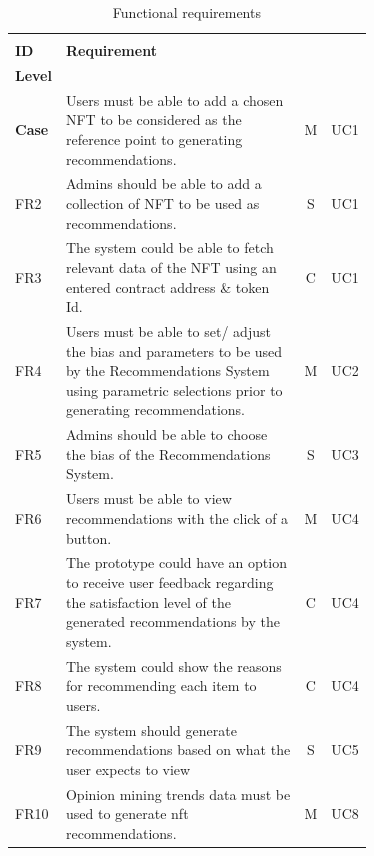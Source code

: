 \begin{longtable}{|l|p{0.71\linewidth}|c|l|}
\caption{Functional requirements}\\ 
\hline
\begin{tabular}[c]{@{}l@{}}\textbf{FR}\\\textbf{ID}\end{tabular}
& \textbf{Requirement} & \begin{tabular}[c]{@{}c@{}}\textbf{Priority}\\\textbf{Level}\end{tabular} & 
\begin{tabular}[c]{@{}c@{}}\textbf{Use}\\\textbf{Case}\end{tabular}
\endfirsthead 
\hline
FR1 & Users must be able to add a chosen NFT to be considered as the reference point to generating recommendations. & M & UC1 \\ 
\hline
FR2 & Admins should be able to add a collection of NFT to be used as recommendations. & S & UC1 \\ 
\hline
FR3 & The system could be able to fetch relevant data of the NFT using an entered contract address \& token Id. & C & UC1 \\ 
\hline
FR4 & Users must be able to set/ adjust the bias and parameters to be used by the Recommendations System using parametric selections prior to generating recommendations. & M & UC2 \\ 
\hline
FR5 & Admins should be able to choose the bias of the Recommendations System. & S & UC3 \\ 
\hline
FR6 & Users must be able to view recommendations with the click of a button. & M & UC4 \\
\hline
FR7 & The prototype could have an option to receive user feedback regarding the satisfaction level of the generated recommendations by the system. & C & UC4 \\
\hline
FR8 & The system could show the reasons for recommending each item to users. & C & UC4 \\ 
\hline
FR9 & The system should generate recommendations based on what the user expects to view & S & UC5 \\ 
\hline
FR10 & Opinion mining trends data must be used to generate \gls{nft} recommendations. & M & UC8\\

\end{longtable}
